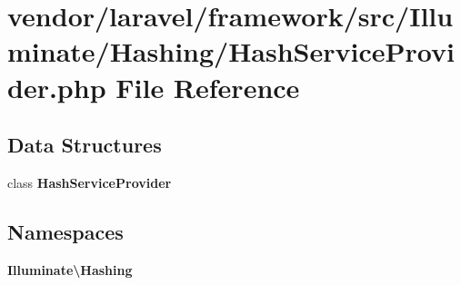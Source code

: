 \section{vendor/laravel/framework/src/\+Illuminate/\+Hashing/\+Hash\+Service\+Provider.php File Reference}
\label{_hash_service_provider_8php}
\subsection*{Data Structures}
\begin{DoxyCompactItemize}
\item 
class {\bf Hash\+Service\+Provider}
\end{DoxyCompactItemize}
\subsection*{Namespaces}
\begin{DoxyCompactItemize}
\item 
 {\bf Illuminate\textbackslash{}\+Hashing}
\end{DoxyCompactItemize}
